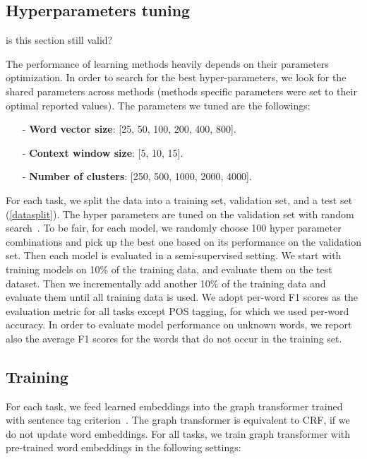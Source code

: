 \documentclass[11pt]{article}
\begin{document}
\subsection{Hyperparameters tuning}

{\color{red} is this section still valid?}

The performance of learning methods heavily depends on their parameters optimization. 
In order to search for the best hyper-parameters, we look for the shared parameters across methods (methods specific parameters were set to their optimal reported values). The parameters we tuned are the followings:

\begin{small}
\begin{itemize}
\item[-]\textbf{Word vector size}: [25, 50, 100, 200, 400, 800].
\item[-]\textbf{Context window size}: [5, 10, 15].
\item[-]\textbf{Number of clusters}: [250, 500, 1000, 2000, 4000]. 
\end{itemize}
\end{small}

For each task, we split the data into a training set, validation set, and a test set (\ref{datasplit}). The hyper parameters are tuned on the validation set with random search~\cite{bergstra2012random}. To be fair, for each model, we randomly choose 100 hyper parameter combinations and pick up the best one based on its performance on the validation set. Then each model is evaluated in a semi-supervised setting. We start with training models on 10\% of the training data, and evaluate them on the test dataset. Then we incrementally add another 10\% of the training data and evaluate them until all training data is used. We adopt per-word F1 scores as the evaluation metric for all tasks except POS tagging, for which we used per-word accuracy.
In order to evaluate model performance on unknown words, we report also the average F1 scores for the words that do not occur in the training set.


\subsection{Training}
For each task, we feed learned embeddings into the graph transformer trained with sentence tag criterion~\cite{turian2010word}. The graph transformer is equivalent to CRF, if we do not update word embeddings. For all tasks, we train graph transformer with pre-trained word embeddings in the following settings: 
\end{document}
